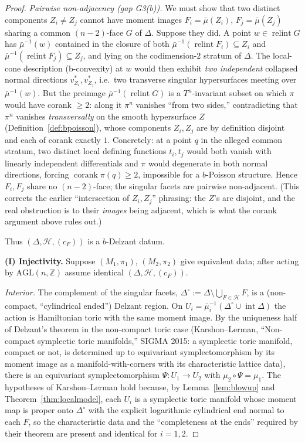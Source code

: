 \documentclass{amsart}
\theoremstyle{definition}
\begin{document}
\begin{proof}
\emph{Pairwise non-adjacency (gap G3(b)).} We must show that two distinct
components $Z_i\neq Z_j$ cannot have moment images $F_i=\bar\mu(Z_i)$,
$F_j=\bar\mu(Z_j)$ sharing a common $(n-2)$-face $G$ of $\Delta$. Suppose they
did. A point $w\in\operatorname{relint}G$ has $\bar\mu^{-1}(w)$ contained in the
closure of both $\bar\mu^{-1}(\operatorname{relint}F_i)\subseteq Z_i$ and
$\bar\mu^{-1}(\operatorname{relint}F_j)\subseteq Z_j$, and lying on the codimension-$2$
stratum of $\Delta$. The local-cone description (b-convexity) at $w$ would then
exhibit \emph{two independent} collapsed normal directions $v^*_{Z_i},v^*_{Z_j}$,
i.e.\ two transverse singular hypersurfaces meeting over $\bar\mu^{-1}(w)$. But
the preimage $\bar\mu^{-1}(\operatorname{relint}G)$ is a $T^n$-invariant subset
on which $\pi$ would have corank $\ge2$: along it $\pi^n$ vanishes ``from two
sides,'' contradicting that $\pi^n$ vanishes \emph{transversally} on the smooth
hypersurface $Z$ (Definition~\ref{def:bpoisson}), whose components $Z_i,Z_j$
are by definition disjoint and each of corank exactly $1$. Concretely: at a
point $q$ in the alleged common stratum, two distinct local defining functions
$t_i,t_j$ would both vanish with linearly independent differentials and $\pi$
would degenerate in both normal directions, forcing $\operatorname{corank}
\pi(q)\ge2$, impossible for a $b$-Poisson structure. Hence $F_i,F_j$ share no
$(n-2)$-face; the singular facets are pairwise non-adjacent. (This corrects the
earlier ``intersection of $Z_i,Z_j$'' phrasing: the $Z$'s are disjoint, and the
real obstruction is to their \emph{images} being adjacent, which is what the
corank argument above rules out.)

Thus $(\Delta,\mathcal H,(c_F))$ is a $b$-Delzant datum.

\medskip
\noindent\textbf{(I) Injectivity.}
Suppose $(M_1,\pi_1)$, $(M_2,\pi_2)$ give equivalent data; after acting by
$\mathrm{AGL}(n,\mathbb Z)$ assume identical $(\Delta,\mathcal H,(c_F))$.

\emph{Interior.} The complement of the singular facets, $\Delta^\circ:=
\Delta\setminus\bigcup_{F\in\mathcal H}F$, is a (non-compact, ``cylindrical
ended'') Delzant region. On $U_i=\bar\mu_i^{-1}(\Delta^\circ\cup\operatorname
{int}\Delta)$ the action is Hamiltonian toric with the same moment image. By the
uniqueness half of Delzant's theorem in the non-compact toric case (Karshon--Lerman,
``Non-compact symplectic toric manifolds,'' SIGMA 2015: a symplectic toric
manifold, compact or not, is determined up to equivariant symplectomorphism by
its moment image as a manifold-with-corners with its characteristic lattice
data), there is an equivariant symplectomorphism $\Psi\colon U_1\to U_2$ with
$\mu_2\circ\Psi=\mu_1$. The hypotheses of Karshon--Lerman hold because, by
Lemma~\ref{lem:blowup} and Theorem~\ref{thm:localmodel}, each $U_i$ is a
symplectic toric manifold whose moment map is proper onto $\Delta^\circ$ with
the explicit logarithmic cylindrical end normal to each $F$, so the
characteristic data and the ``completeness at the ends'' required by their
theorem are present and identical for $i=1,2$.


\end{proof}
\end{document}
